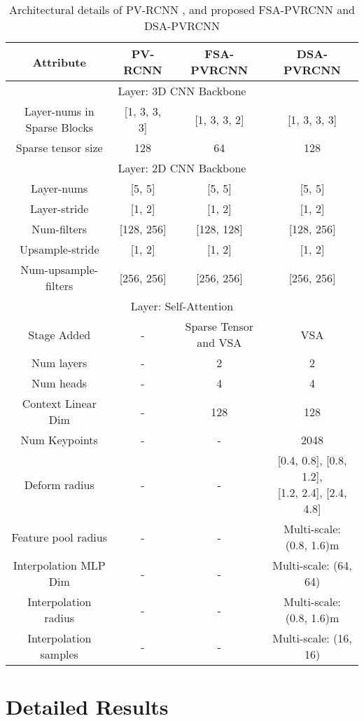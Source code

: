\documentclass[10pt,twocolumn,letterpaper]{article}
\begin{document}
\begin{table*}[ht]
    \centering
    \begin{tabular*}{\textwidth}{|c||c|c|c|}
        \hline
        Attribute & PV-RCNN \cite{PVRCNN} & FSA-PVRCNN & DSA-PVRCNN \\
        \hline
        \hline
        \multicolumn{4}{|c|}{Layer: 3D CNN Backbone}  \\ \cline{1-4}
        \hline
         Layer-nums in Sparse Blocks & [1, 3, 3, 3]  & [1, 3, 3, 2] & [1, 3, 3, 3]\\
         \hline
         Sparse tensor size & 128 & 64 & 128 \\
         \hline
         \hline
         \multicolumn{4}{|c|}{Layer: 2D CNN Backbone}  \\ 
        \hline
        \hline
         Layer-nums & [5, 5] & [5, 5] & [5, 5]\\
         \hline
         Layer-stride & [1, 2] & [1, 2] & [1, 2] \\
         \hline
         Num-filters & [128, 256] & [128, 128] & [128, 256] \\
         \hline
         Upsample-stride & [1, 2] & [1, 2] & [1, 2] \\
         \hline
         Num-upsample-filters &  [256, 256] & [256, 256] & [256, 256] \\
         \hline
         \hline
        \multicolumn{4}{|c|}{Layer: Self-Attention}  \\ 
        \hline
        \hline
        Stage Added & - & Sparse Tensor and VSA & VSA \\
         \hline
          Num layers  & - & 2 & 2 \\
         \hline
          Num heads & - & 4 & 4 \\
          \hline
         Context Linear Dim & - & 128 & 128 \\
         \hline
         Num Keypoints & -  & - & 2048 \\
         \hline
         Deform radius &  - & - & \makecell{[0.4, 0.8], [0.8, 1.2], \\ {[1.2, 2.4], [2.4, 4.8]}} \\
         \hline
         Feature pool radius  & - & - & Multi-scale: (0.8, 1.6)m \\
         \hline
         Interpolation MLP Dim  & - & - & Multi-scale: (64, 64) \\
         \hline
         Interpolation radius  & - & - & Multi-scale: (0.8, 1.6)m \\
         \hline
         Interpolation samples  & - & - & Multi-scale: (16, 16) \\
         \hline
         
    \end{tabular*}
    \caption{Architectural details of PV-RCNN \cite{PVRCNN}, and proposed FSA-PVRCNN and DSA-PVRCNN}
    \label{tab:pvrcnn}
\end{table*}  \section{Detailed Results}
\end{document}
